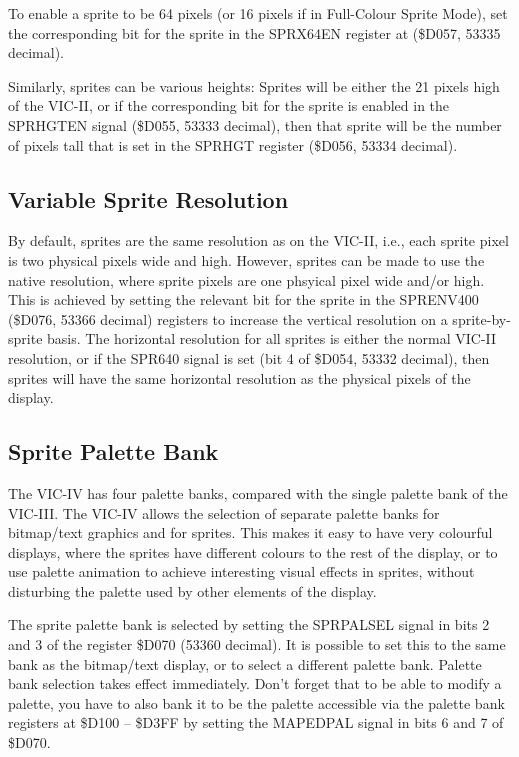 To enable a sprite to be 64 pixels (or 16 pixels if in Full-Colour Sprite Mode), set the corresponding bit for the sprite in the SPRX64EN register at (\$D057, 53335 decimal).

Similarly, sprites can be various heights:  Sprites will be either the 21 pixels high of the VIC-II, or if the corresponding bit for the sprite is enabled in the SPRHGTEN signal (\$D055, 53333 decimal), then that sprite will be the number of pixels tall that is set in the SPRHGT
register (\$D056, 53334 decimal).  

\subsection{Variable Sprite Resolution}

By default, sprites are the same resolution as on the VIC-II, i.e., each sprite pixel is two physical pixels wide and high.
However, sprites can be made to use the native resolution, where sprite pixels are one phsyical pixel wide and/or high.
This is achieved by setting the relevant bit for the sprite in the SPRENV400 (\$D076, 53366 decimal) registers to increase the
vertical resolution on a sprite-by-sprite basis.  The horizontal resolution for all sprites is either the normal VIC-II resolution, or if the SPR640 signal
is set (bit 4 of \$D054, 53332 decimal), then sprites will have the same horizontal resolution as the physical pixels of the display.

\subsection{Sprite Palette Bank}

The VIC-IV has four palette banks, compared with the single palette bank of the VIC-III.
The VIC-IV allows the selection of separate palette banks for bitmap/text graphics and for sprites.  This makes it easy to have
very colourful displays, where the sprites have different colours to the rest of the display, or to use palette animation to achieve
interesting visual effects in sprites, without disturbing the palette used by other elements of the display.

The sprite palette bank is selected by setting the SPRPALSEL signal in bits 2 and 3 of the register \$D070 (53360 decimal).
It is possible to set this to the same bank as the bitmap/text display, or to select a different palette bank.
Palette bank selection takes effect immediately.  Don't forget that to be able to modify a palette, you have to also bank it
to be the palette accessible via the palette bank registers at \$D100 -- \$D3FF by setting the MAPEDPAL signal in bits 6 and 7 of
\$D070.

